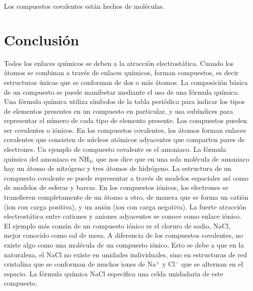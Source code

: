 \documentclass[12pt,addpoints,answers]{guia}
\begin{document}
\begin{questions}
    \begin{solutionbox}{1.2cm}
        Los compuestos covalentes están hechos de moléculas.
    \end{solutionbox}

    \section{Conclusión}
    Todos los enlaces químicos se deben a la atracción electrostática. Cuando los átomos se combinan a través de enlaces químicos, forman compuestos, es decir estructuras únicas que se conforman de dos o más átomos. La composición básica de un compuesto se puede manifestar mediante el uso de una fórmula química. Una fórmula química utiliza símbolos de la tabla periódica para indicar los tipos de elementos presentes en un compuesto en particular, y usa subíndices para representar el número de cada tipo de elemento presente.
    Los compuestos pueden ser covalentes o iónicos. En los compuestos covalentes, los átomos forman enlaces covalentes que consisten de núcleos atómicos adyacentes que comparten pares de electrones. Un ejemplo de compuesto covalente es el amoniaco. La fórmula química del amoniaco es NH$_3$, que nos dice que en una sola molécula de amoniaco hay un átomo de nitrógeno y tres átomos de hidrógeno. La estructura de un compuesto covalente se puede representar a través de modelos espaciales así como de modelos de esferas y barras.
    En los compuestos iónicos, los electrones se transfieren completamente de un átomo a otro, de manera que se forma un catión (ion con carga positiva), y un anión (ion con carga negativa). La fuerte atracción electrostática entre cationes y aniones adyacentes se conoce como enlace iónico. El ejemplo más común de un compuesto iónico es el cloruro de sodio, NaCl, mejor conocido como sal de mesa. A diferencia de los compuestos covalentes, no existe algo como una molécula de un compuesto iónico. Esto se debe a que en la naturaleza, el NaCl no existe en unidades individuales, sino en estructuras de red cristalina que se conforman de muchos iones de Na$^+$ y Cl$^-$ que se alternan en el espacio. La fórmula química NaCl especifica una celda unidadaria de este compuesto.
\end{questions}
\end{document}
